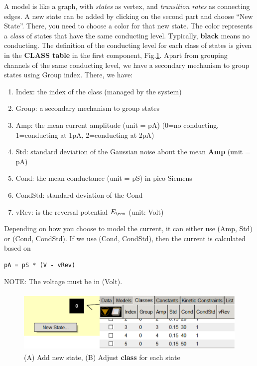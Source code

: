 A model is like a graph, with {\it states} as vertex, and {\it transition rates}
as connecting edges. A new state can be added by clicking on the second part and
choose ``New State''. There, you need to choose a color for that new state. The
color represents a {\it class} of states that have the same conducting level.
Typically, {\bf black} means no conducting. The definition of the conducting
level for each class of states is given in the {\bf CLASS table} in the first
component, Fig.\ref{fig:QuB_Express_02}. Apart from grouping channels of the
same conducting level, we have a secondary mechanism to group states using Group
index. There, we have:
\begin{enumerate}
  \item Index: the index of the class (managed by the system)
  \item Group: a secondary mechanism to group states
  \item Amp:  the mean current amplitude (unit = pA) (0=no conducting,
  1=conducting at 1pA, 2=conducting at 2pA)
  \item Std: standard deviation of the Gaussian noise about the mean {\bf Amp}
  (unit = pA)
  \item Cond: the mean conductance (unit = pS) in pico Siemens
  \item CondStd: standard deviation of the Cond
  \item vRev: is the reversal potential $E_\rev$ (unit: Volt)
\end{enumerate}
Depending on how you choose to model the current, it can either use (Amp, Std)
or (Cond, CondStd). If we use (Cond, CondStd), then the current is calculated
based on
\begin{verbatim}
pA = pS * (V - vRev)
\end{verbatim}
NOTE: The voltage must be in (Volt).


\begin{figure}[hbt]
  \centerline{\includegraphics[height=3cm,
    angle=0]{./images/QuB_Express_02.eps}}
  \caption{(A) Add new state, (B) Adjust {\bf class} for each state}
  \label{fig:QuB_Express_02}
\end{figure}


